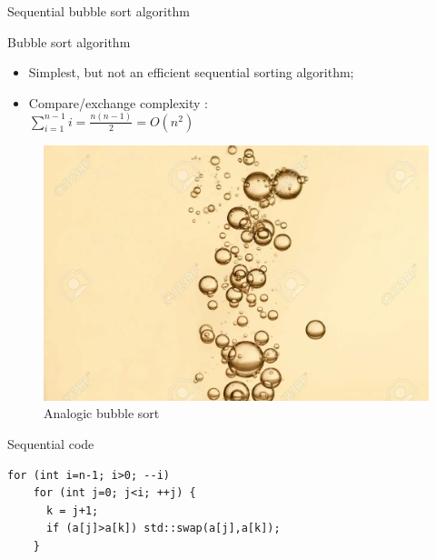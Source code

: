 \documentclass[compress,10pt,aspectratio=169]{beamer}
\begin{document}
\begin{frame}[fragile]{Sequential bubble sort algorithm}
  \scriptsize
  \begin{multicols}{2}
  \begin{block}{Bubble sort algorithm}
    \begin{itemize}
    \item Simplest, but not an efficient sequential sorting algorithm;
    \item Compare/exchange complexity :\\
      $\displaystyle
      \sum_{i=1}^{n-1}i = \frac{n(n-1)}{2} = O(n^{2})
      $
    \end{itemize}
  \end{block}

  \begin{figure}[h]
    \includegraphics[width=0.5\linewidth]{../Images/bulles.jpg}
    \caption{Analogic bubble sort}
  \end{figure}
  \end{multicols}
  
  \begin{exampleblock}{Sequential code}
    \begin{verbatim}
for (int i=n-1; i>0; --i)
    for (int j=0; j<i; ++j) {
      k = j+1;
      if (a[j]>a[k]) std::swap(a[j],a[k]);
    }
    \end{verbatim}
  \end{exampleblock}
\end{frame}
\end{document}
